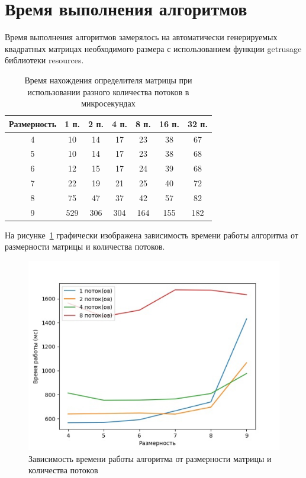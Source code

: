 \documentclass[12pt]{report}
\begin{document}
    \section{Время выполнения алгоритмов}

    Время выполнения алгоритмов замерялось на автоматически генерируемых
    квадратных матрицах необходимого размера с использованием функции getrusage библиотеки resources.

    \begin{table}[h]
        \begin{center}
            \captionsetup{justification=raggedleft, singlelinecheck=false}
            \caption{\label{time} Время нахождения определителя матрицы при
            использовании разного количества потоков в микросекундах}
            \begin{tabular}{|c c c c c c c|}
                \hline
                Размерность & 1 п. & 2 п. & 4 п. & 8 п. & 16 п. & 32 п.
                \\
                \hline
                4 & 10  & 14  & 17  & 23  & 38  & 67  \\
                \hline
                5 & 10  & 14  & 17  & 23  & 38  & 68  \\
                \hline
                6 & 12  & 15  & 17  & 24  & 39  & 68  \\
                \hline
                7 & 22  & 19  & 21  & 25  & 40  & 72  \\
                \hline
                8 & 75  & 47  & 37  & 42  & 57  & 82  \\
                \hline
                9 & 529 & 306 & 304 & 164 & 155 & 182 \\
                \hline
            \end{tabular}
        \end{center}
    \end{table}

    На рисунке~\ref{img:graph} графически изображена зависимость
    времени работы алгоритма от размерности матрицы и количества потоков.

    \begin{figure}[H]
        \centering
        \includegraphics[width=0.8\linewidth]{img/graph}
        \caption{
            Зависимость времени работы алгоритма от размерности матрицы и количества потоков
        }
        \label{img:graph}
    \end{figure}
\end{document}

